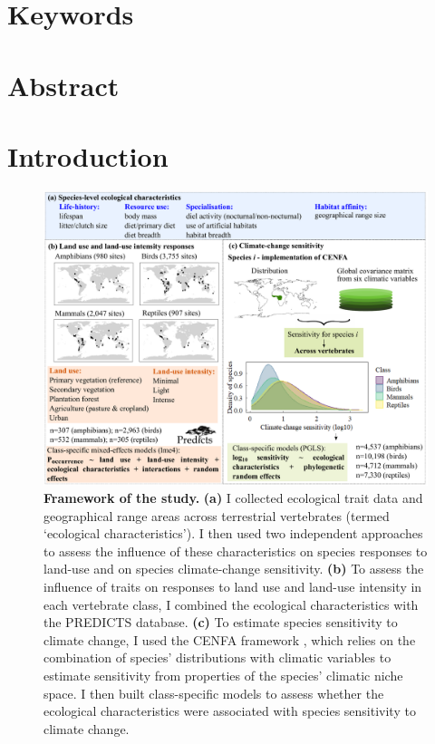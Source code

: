 
\section*{Keywords}

\section*{Abstract}

\section{Introduction}


\begin{figure}[h!]
\centering
\includegraphics[scale=0.55]{figures/Chapter4/Figure1}
\caption[Framework of the study]{\textbf{Framework of the study.} \textbf{(a)} I collected ecological trait data and geographical range areas across terrestrial vertebrates (termed `ecological characteristics'). I then used two independent approaches to assess the influence of these characteristics on species responses to land-use and on species climate-change sensitivity. \textbf{(b)} To assess the influence of traits on responses to land use and land-use intensity in each vertebrate class, I combined the ecological characteristics with the PREDICTS database. \textbf{(c)} To estimate species sensitivity to climate change, I used the CENFA framework \citep{Rinnan2019}, which relies on the combination of species’ distributions with climatic variables to estimate sensitivity from properties of the species’ climatic niche space. I then built class-specific models to assess whether the ecological characteristics were associated with  species sensitivity to climate change.}
\label{chap4_fig1}
\end{figure}

